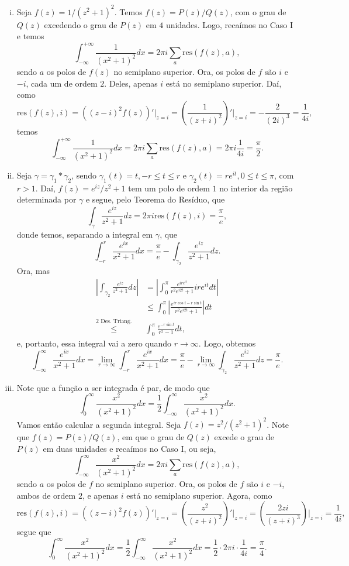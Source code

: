 \documentclass[12pt,a4paper]{article}
\newcommand{\res}{\mathrm{res}}
\begin{document}
\begin{enumerate}
\begin{enumerate}[(i)]
		\item Seja $f(z) = 1/(z^2+1)^2$. Temos $f(z) = P(z)/Q(z)$, com o grau de $Q(z)$ excedendo o grau de $P(z)$ em $4$ unidades. Logo, recaímos no Caso I e temos
		$$
		\int_{-\infty}^{+\infty}\frac{1}{(x^2+1)^2}dx = 2\pi i\sum_a\res\left( f(z),a \right),
		$$
		sendo $a$ os polos de $f(z)$ no semiplano superior. Ora, os polos de $f$ são $i$ e $-i$, cada um de ordem $2$. Deles, apenas $i$ está no semiplano superior. Daí, como
		$$
		\res(f(z),i) = \left( (z-i)^2f(z) \right)'\Big|_{z=i} = \left( \frac{1}{(z+i)^2} \right)'\Big|_{z=i} = -\frac{2}{(2i)^3} = \frac{1}{4i},
		$$
		temos
		$$
		\int_{-\infty}^{+\infty}\frac{1}{(x^2+1)^2}dx = 2\pi i\sum_a\res\left( f(z),a \right) = 2\pi i\frac{1}{4i} = \frac{\pi}{2}.
		$$
		
		\item Seja $\gamma = \gamma_1\ast\gamma_2$, sendo $\gamma_1(t) = t, -r\leq t\leq r$ e $\gamma_2(t) = re^{it}, 0\leq t\leq\pi$, com $r>1$. Daí, $f(z) = e^{iz}/z^2+1$ tem um polo de ordem $1$ no interior da região determinada por $\gamma$ e segue, pelo Teorema do Resíduo, que
		$$
		\int_{\gamma}\frac{e^{iz}}{z^2+1}dz = 2\pi i\res\left( f(z), i \right) = \frac{\pi}{e},
		$$
		donde temos, separando a integral em $\gamma$, que
		$$
		\int_{-r}^{r}\frac{e^{ix}}{x^2+1}dx = \frac{\pi}{e} - \int_{\gamma_2}\frac{e^{iz}}{z^2+1}dz.
		$$
		Ora, mas
		\begin{align*}
		\left|\int_{\gamma_2}\frac{e^{iz}}{z^2+1}dz \right| &= \left|\int_{0}^{\pi}\frac{e^{ire^{it}}}{r^2e^{i2t} + 1}ire^{it}dt\right| \\
		&\leq \int_{0}^{\pi}\left| \frac{e^{ir\cos t -r\sin t}}{r^2e^{i2t} + 1} \right|dt \\
		\stackrel{\text{2 Des. Triang.}}{\leq}& \int_{0}^{\pi}\frac{e^{-r\sin t}}{r^2-1}dt,
		\end{align*}
		e, portanto, essa integral vai a zero quando $r\to\infty$. Logo, obtemos
		$$
		\int_{-\infty}^{\infty}\frac{e^{ix}}{x^2+1}dx = \lim\limits_{r\to\infty} \int_{-r}^{r}\frac{e^{ix}}{x^2+1}dx = \frac{\pi}{e} - \lim\limits_{r\to\infty}\int_{\gamma_2}\frac{e^{iz}}{z^2+1}dz = \frac{\pi}{e}.
		$$
		
		\item Note que a função a ser integrada é par, de modo que
		$$
		\int_{0}^{\infty}\frac{x^2}{(x^2+1)^2}dx = \frac{1}{2}\int_{-\infty}^{\infty}\frac{x^2}{(x^2+1)^2}dx.
		$$
		Vamos então calcular a segunda integral. Seja $f(z) = z^2/(z^2+1)^2$. Note que $f(z) = P(z)/Q(z)$, em que o grau de $Q(z)$ excede o grau de $P(z)$ em duas unidades e recaímos no Caso I, ou seja,
		$$
		\int_{-\infty}^{\infty}\frac{x^2}{(x^2+1)^2}dx = 2\pi i\sum_a\res(f(z),a),
		$$
		sendo $a$ os polos de $f$ no semiplano superior. Ora, os polos de $f$ são $i$ e $-i$, ambos de ordem $2$, e apenas $i$ está no semiplano superior. Agora, como
		$$
		\res(f(z),i) = ((z-i)^2f(z))'\Big|_{z=i} = \left( \frac{z^2}{(z+i)^2} \right)'\Bigg|_{z=i} = \left( \frac{2zi}{(z+i)^3} \right)\Bigg|_{z=i} = \frac{1}{4i},
		$$
		segue que
		$$
		\int_{0}^{\infty}\frac{x^2}{(x^2+1)^2}dx = \frac{1}{2}\int_{-\infty}^{\infty}\frac{x^2}{(x^2+1)^2}dx = \frac{1}{2}\cdot 2\pi i\cdot\frac{1}{4i} = \frac{\pi}{4}.
		$$
		

\end{enumerate}
\end{enumerate}
\end{document}
